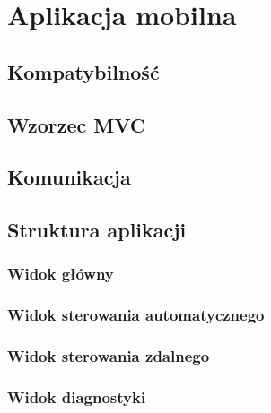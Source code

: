 \chapter{Aplikacja mobilna}
\section{Kompatybilność}
\section{Wzorzec MVC}
\section{Komunikacja}

\section{Struktura aplikacji}
\subsection{Widok główny}
\subsection{Widok sterowania automatycznego}
\subsection{Widok sterowania zdalnego}
\subsection{Widok diagnostyki}